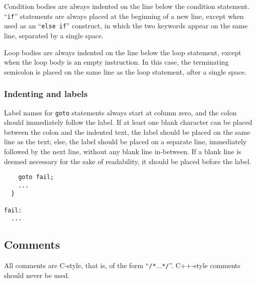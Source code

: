 Condition bodies are always indented on the line below the condition
statement. ``\texttt{if}'' statements are always placed at the beginning
of a new line, except when used as an ``\texttt{else~if}''
construct, in which the two keywords appear on the same line,
separated by a single space.

Loop bodies are always indented on the line below the loop statement,
except when the loop body is an empty instruction. In this case, the
terminating semicolon is placed on the same line as the loop
statement, after a single space.

\subsubsection{Indenting and labels}

Label names for \texttt{goto} statements always start at column zero,
and the colon should immediately follow the label. If at least one
blank character can be placed between the colon and the indented text,
the label should be placed on the same line as the text; else, the
label should be placed on a separate line, immediately followed by the
next line, without any blank line in-between. If a blank line is
deemed necessary for the sake of readability, it should be placed
before the label.
\begin{lstlisting}
    goto fail;
    ...
  }

fail:
  ...
\end{lstlisting}

\subsection{Comments}

All comments are C-style, that is, of the form
``\texttt{/*}$\ldots$\texttt{*/}''. C++-style comments should never be
used.


